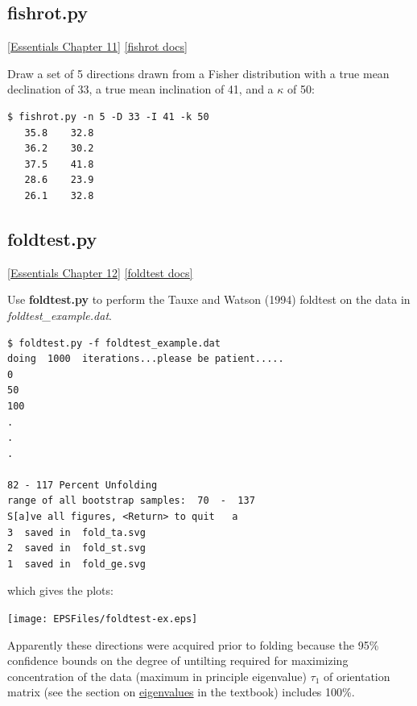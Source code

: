 \documentclass[11pt]{book}
\begin{document}
{{{
\subsection{fishrot.py}
\href{http://earthref.org/MAGIC/books/Tauxe/Essentials/WebBook3ch11.html#ch11}{ [Essentials Chapter 11]}
\href{https://github.com/PmagPy/PmagPy/blob/master/programs/fishrot.py}{[fishrot docs]}

Draw a set of 5 directions drawn  from a Fisher distribution with a true mean declination of 33, a true mean inclination of 41, and a $\kappa$ of  50:

\begin{verbatim}
$ fishrot.py -n 5 -D 33 -I 41 -k 50
   35.8    32.8
   36.2    30.2
   37.5    41.8
   28.6    23.9
   26.1    32.8
   \end{verbatim}

 \subsection{foldtest.py}
 \href{http://earthref.org/MAGIC/books/Tauxe/Essentials/WebBook3ch12.html#ch12}{[Essentials Chapter 12]}
 \href{https://github.com/PmagPy/PmagPy/blob/master/programs/foldtest.py}{[foldtest docs]}

 Use {\bf foldtest.py} to perform the Tauxe and Watson (1994) \nocite{tauxe94}  foldtest on the data in {\it foldtest\_example.dat}.

 \begin{verbatim}
$ foldtest.py -f foldtest_example.dat
doing  1000  iterations...please be patient.....
0
50
100
.
.
.

82 - 117 Percent Unfolding
range of all bootstrap samples:  70  -  137
S[a]ve all figures, <Return> to quit   a
3  saved in  fold_ta.svg
2  saved in  fold_st.svg
1  saved in  fold_ge.svg
 \end{verbatim}

\noindent  which gives the plots:

 {%
   \texttt{[image: EPSFiles/foldtest-ex.eps]}}

 Apparently these directions were acquired prior to folding because the 95\% confidence bounds on the degree of untilting required for maximizing concentration of the data (maximum in principle eigenvalue) $\tau_1$ of orientation matrix (see the section on  \href{http://earthref.org/MAGIC/books/Tauxe/Essentials/WebBook3ap1.html#orientation_tensor}{eigenvalues} in the textbook) includes 100\%.
%
%

}}}
\end{document}
